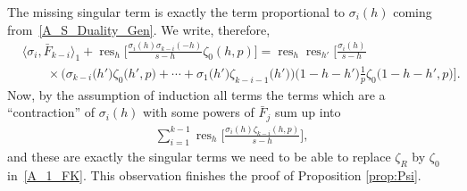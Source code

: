\documentclass[10pt,a4paper]{amsart}
\numberwithin{equation}{section}
\DeclareMathOperator{\res}{res}
\begin{document}
The missing singular term is exactly the term proportional to $\sigma_i(h)$ coming from~\eqref{A_S_Duality_Gen}. We write, therefore,
\begin{align*}
&\bigl\langle \sigma_i, \bar{F}_{k-i} \bigr\rangle_1 + \res_h \biggl[ \frac{\sigma_i(h) \sigma_{k-i}(-h)}{s-h} \zeta_0(h, p)\biggr] = \res_h\res_{h'} \biggl[ \frac{\sigma_i(h)}{s-h}\\
&\qquad{}\times\bigl(\sigma_{k-i}\bigl(h'\bigr)\zeta_0\bigl(h', p\bigr) + \cdots + \sigma_1\bigl(h'\bigr)\zeta_{k-i-1}\bigl(h'\bigr)\bigr)\bigl(1-h-h'\bigr)\frac{1}{p}\zeta_0\bigl(1-h-h', p\bigr) \biggr].
\end{align*}
Now, by the assumption of induction all terms the terms which are a ``contraction'' of $\sigma_i(h)$ with some powers of $\bar{F}_j$ sum up into
\begin{align*}
\sum_{i=1}^{k-1} \res_h\biggl[\frac{\sigma_i(h) \zeta_{k-i}(h, p)}{s-h} \biggr],
\end{align*}
and these are exactly the singular terms we need to be able to replace $\zeta_R$ by $\zeta_0$ in~\eqref{A_1_FK}. This observation finishes the proof of Proposition \ref{prop:Psi}.
\end{document}
